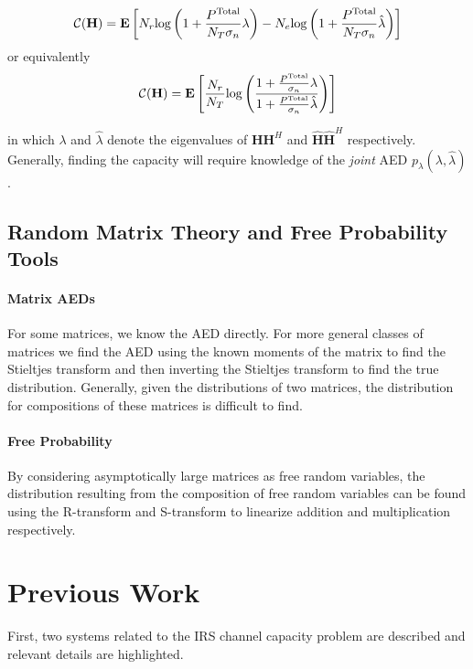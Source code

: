 \documentclass[12pt,a4paper]{report}
\begin{document}
\begin{enumerate}
\begin{gather}\label{secrecy_capacity}
\mathcal{C{}}{(\mathbf{H})} = \mathop{\bf E{}}\left[N_r \text{log{}}\left(1+\frac{P^{\text{Total}}}{N_T \sigma_n}\lambda \right) -
N_e \text{log{}}\left(1+\frac{P^{\text{Total}}}{N_T \sigma_n}\hat{\lambda} \right) \right]
\end{gather}
or equivalently 
\begin{gather}\label{secrecy_capacity}
\mathcal{C{}}{(\mathbf{H})} = \mathop{\bf E{}}\left[\frac{N_r}{N_T }\text{log{}}\left(\frac{1+\frac{P^{\text{Total}}}{\sigma_n}\lambda }{1+\frac{P^{\text{Total}}}{\sigma_n}\hat{\lambda} }\right) \right]
\end{gather}

in which $\lambda$ and $\hat{\lambda}$ denote the eigenvalues of $\mathbf{H}\mathbf{H}^H$ and $\hat{\mathbf{H}}\hat{\mathbf{H}}^H$ respectively. 
Generally, finding the capacity will require knowledge of the \emph{joint} AED $p_{\lambda}(\lambda,\hat{\lambda})$.

\end{enumerate}
\section{Random Matrix Theory and Free Probability Tools}

\subsubsection{Matrix AEDs}
For some matrices, we know the AED directly. For more general classes of matrices we find the AED using the known moments of the matrix to find the Stieltjes transform and then inverting the Stieltjes transform to find the true distribution. Generally, given the distributions of two matrices, the distribution for compositions of these matrices is difficult to find. 

\subsubsection{Free Probability}
By considering asymptotically large matrices as free random variables, the distribution resulting from the composition of free random variables can be found using the R-transform and S-transform to linearize addition and multiplication respectively.

\chapter{Previous Work}
First, two systems related to the IRS channel capacity problem are described and relevant details are highlighted. 
\end{document}
